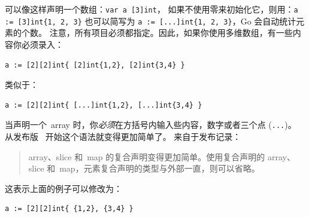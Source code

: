 可以像这样声明一个数组：\lstinline{var a [3]int}，
如果不使用零来初始化它，则用：\lstinline|a := [3]int{1, 2, 3}| 也可以简写为
\lstinline|a := [...]int{1, 2, 3}|，Go 会自动统计元素的个数。
注意，所有项目必须都指定。因此，如果你使用多维数组，有一些内容你必须录入：
\begin{lstlisting}
a := [2][2]int{ [2]int{1,2}, [2]int{3,4} }
\end{lstlisting}
类似于：
\begin{lstlisting}
a := [2][2]int{ [...]int{1,2}, [...]int{3,4} }
\end{lstlisting}
当声明一个~array 时，你\emph{必须}在方括号内输入些内容，数字或者三个点
(\verb|...|)。%
从发布版~\cite{go_release_hist} 开始这个语法就变得更加简单了。
来自于发布记录：
\begin{quote}
array、slice 和~map 的复合声明变得更加简单。使用复合声明的
array、slice 和~map，元素复合声明的类型与外部一直，则可以省略。
\end{quote}
这表示上面的例子可以修改为：
\begin{lstlisting}
a := [2][2]int{ {1,2}, {3,4} }
\end{lstlisting}

